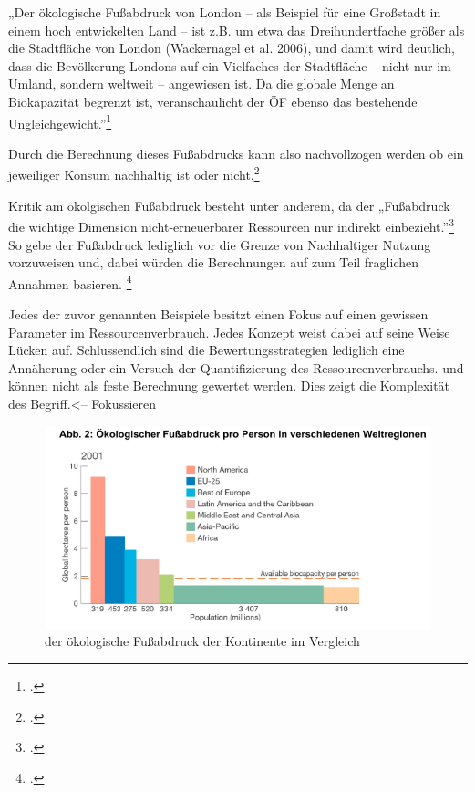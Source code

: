 \documentclass{scrartcl}
\begin{document}
\begin{displayquote}
„Der ökologische Fußabdruck von London – als Beispiel für eine Großstadt in einem hoch entwickelten Land – ist z.B. um etwa das Dreihundertfache größer als die Stadtfläche von London (Wackernagel et al. 2006), und damit wird deutlich, dass die Bevölkerung Londons auf ein Vielfaches der Stadtfläche – nicht nur im Umland, sondern weltweit – angewiesen ist. Da die globale Menge an Biokapazität begrenzt ist, veranschaulicht der ÖF ebenso das bestehende Ungleichgewicht.”\footcite{AntjeFlade2015StadtStadtforschung, S.192}
\end{displayquote} 

Durch die Berechnung dieses Fußabdrucks kann also nachvollzogen werden ob ein jeweiliger Konsum nachhaltig ist oder nicht.\footcite[S.192]{AntjeFlade2015StadtStadtforschung}

Kritik am ökolgischen Fußabdruck besteht unter anderem, da der „Fußabdruck die wichtige Dimension nicht-erneuerbarer Ressourcen nur indirekt einbezieht.”\footcite[S.3]{StefanGiljum2007WissenschaftlicheFuabdruck} So gebe der Fußabdruck lediglich vor die Grenze von Nachhaltiger Nutzung vorzuweisen und, dabei würden die Berechnungen auf zum Teil fraglichen Annahmen basieren. \footcite[Vgl.][S.3f]{StefanGiljum2007WissenschaftlicheFuabdruck}

Jedes der zuvor genannten Beispiele besitzt einen Fokus auf einen gewissen Parameter im Ressourcenverbrauch. Jedes Konzept weist dabei auf seine Weise Lücken auf. Schlussendlich sind die Bewertungsstrategien lediglich eine Annäherung oder ein Versuch der Quantifizierung des Ressourcenverbrauchs. und können nicht als feste Berechnung gewertet werden. Dies zeigt die Komplexität des Begriff.<-- Fokussieren

\begin{figure}[htbp]
\centering
\includegraphics[width=12cm]{image_folder/oekFussabdruckWelt.png}
\caption{der ökologische Fußabdruck der Kontinente im Vergleich}
\label{fig:oekFussabdruckWelt}
\end{figure}
\end{document}
